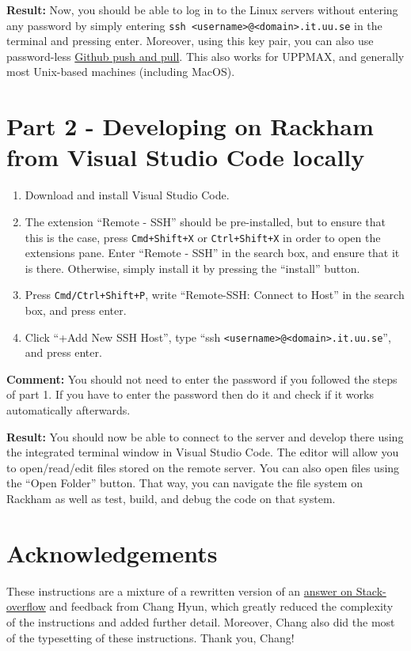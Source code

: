 \documentclass[10pt]{article}
\begin{document}
\textbf{Result:} Now, you should be able to log in to the Linux servers without entering any password by simply entering \texttt{ssh <username>@<domain>.it.uu.se} in the terminal and pressing enter. Moreover, using this key pair, you can also use password-less \href{https://docs.github.com/en/authentication/connecting-to-github-with-ssh/adding-a-new-ssh-key-to-your-github-account}{Github push and pull}. This also works for UPPMAX, and generally most Unix-based machines (including MacOS).

\section{Part 2 - Developing on Rackham from Visual Studio Code locally}
\begin{enumerate}
\item Download and install Visual Studio Code.
\item The extension “Remote - SSH” should be pre-installed, but to ensure that this is the case, press
\texttt{Cmd+Shift+X} or \texttt{Ctrl+Shift+X} in order to open the extensions pane. Enter “Remote - SSH” in the search box, and
ensure that it is there. Otherwise, simply install it by pressing the “install” button.
\item Press \texttt{Cmd/Ctrl+Shift+P}, write “Remote-SSH: Connect to Host” in the search box, and press enter.
\item Click “+Add New SSH Host”, type “ssh \texttt{<username>@<domain>.it.uu.se}”, and press enter.
\end{enumerate}

\textbf{Comment:} You should not need to enter the password if you followed the steps of part 1. If you have
to enter the password then do it and check if it works automatically afterwards.

\textbf{Result:} You should now be able to connect to the server and develop there using the integrated
terminal window in Visual Studio Code. The editor will allow you to open/read/edit files stored on
the remote server. You can also open files using the “Open Folder” button. That
way, you can navigate the file system on Rackham as well as test, build, and debug the code on that
system. 

\section{Acknowledgements}
These instructions are a mixture of a rewritten version of an \href{https://stackoverflow.com/a/69970152/754562}{answer on Stack-overflow} and feedback from Chang Hyun, which greatly reduced the complexity of the instructions and added further detail. Moreover, Chang also did the most of the typesetting of these instructions. Thank you, Chang!
\end{document}
